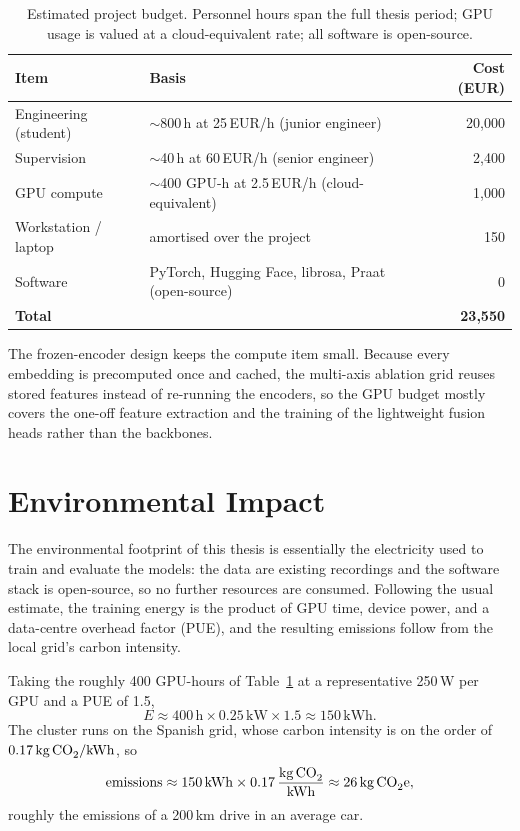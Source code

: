 \documentclass[a4paper,12pt]{article}
\begin{document}
\begin{table}[H]
\centering
\caption[Estimated project budget]{\footnotesize Estimated project budget. Personnel hours span the full thesis period; GPU usage is valued at a cloud-equivalent rate; all software is open-source.}
\label{tab:budget}
\footnotesize{
\begin{tabular}{@{}llr@{}}
\toprule
\textbf{Item} & \textbf{Basis} & \textbf{Cost (EUR)} \\ \midrule
Engineering (student)  & $\sim$800\,h at 25\,EUR/h (junior engineer)        & 20,000 \\
Supervision            & $\sim$40\,h at 60\,EUR/h (senior engineer)         & 2,400 \\
GPU compute            & $\sim$400 GPU-h at 2.5\,EUR/h (cloud-equivalent)   & 1,000 \\
Workstation / laptop   & amortised over the project                         & 150 \\
Software               & PyTorch, Hugging Face, librosa, Praat (open-source) & 0 \\ \midrule
\textbf{Total}         &                                                    & \textbf{23,550} \\
\bottomrule
\end{tabular}
}
\end{table}

The frozen-encoder design keeps the compute item small. Because every embedding is precomputed once and cached, the multi-axis ablation grid reuses stored features instead of re-running the encoders, so the GPU budget mostly covers the one-off feature extraction and the training of the lightweight fusion heads rather than the backbones.

\clearpage

\section{Environmental Impact}

The environmental footprint of this thesis is essentially the electricity used to train and evaluate the models: the data are existing recordings and the software stack is open-source, so no further resources are consumed. Following the usual estimate, the training energy is the product of GPU time, device power, and a data-centre overhead factor (PUE), and the resulting emissions follow from the local grid's carbon intensity.

Taking the roughly 400 GPU-hours of Table~\ref{tab:budget} at a representative 250\,W per GPU and a PUE of 1.5,
\[
E \approx 400\,\text{h} \times 0.25\,\text{kW} \times 1.5 \approx 150\,\text{kWh}.
\]
The cluster runs on the Spanish grid, whose carbon intensity is on the order of $0.17\,\text{kg\,CO}_2/\text{kWh}$, so
\[
\text{emissions} \approx 150\,\text{kWh} \times 0.17\,\frac{\text{kg\,CO}_2}{\text{kWh}} \approx 26\,\text{kg\,CO}_2\text{e},
\]
roughly the emissions of a 200\,km drive in an average car.
\end{document}
